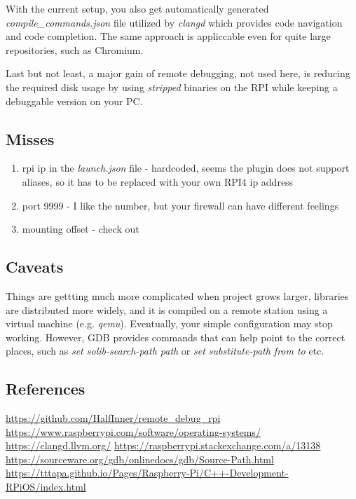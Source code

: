 \documentclass[twocolumn, 10pt]{article}
\makeatletter
\newcommand{\textFontName}{\f@family}
\makeatother
\begin{document}
With the current setup, you also get automatically generated \textit
  {compile\_commands.json} file utilized by \textit{clangd}
  \cite{bib:clangd} which provides code navigation and code completion.
  The same approach is appliccable even for quite large repositories,
  such as Chromium.

Last but not least, a major gain of remote debugging, not used here, is reducing
  the required disk usage by using \textit{stripped} binaries on the RPI while keeping a debuggable version on your PC.

\subsection*{Misses}
\begin{enumerate}
  \item rpi ip in the \textit{launch.json} file - hardcoded, seems the plugin does not support aliases,
        so it has to be replaced with your own RPI4 ip address
  \item port 9999 - I like the number, but your firewall can have different feelings
  \item mounting offset - check \cite{bib:mounting-approach} out
\end{enumerate}

\subsection*{Caveats}
Things are gettting much more complicated when project grows larger,
  libraries are distributed more widely, and it is compiled on a remote
  station using a virtual machine (e.g. \textit{qemu}). Eventually,
  your simple configuration may stop working. However,
  GDB provides commands that can help point to the correct places,
  such as \textit{set solib-search-path path} or
  \textit{set substitute-path from to} etc.\cite{bib:gdb-additional-configs}

\subsection*{References}
\begin{enumerate}[label={[\arabic*]}]
  \footnotesize
   \url{https://github.com/HalfInner/remote_debug_rpi}
   \url{https://www.raspberrypi.com/software/operating-systems/}
   \url{https://clangd.llvm.org/}
   \url{https://raspberrypi.stackexchange.com/a/13138}
   \url{https://sourceware.org/gdb/onlinedocs/gdb/Source-Path.html}
   \url{https://tttapa.github.io/Pages/Raspberry-Pi/C++-Development-RPiOS/index.html}
\end{enumerate}

\end{document}
